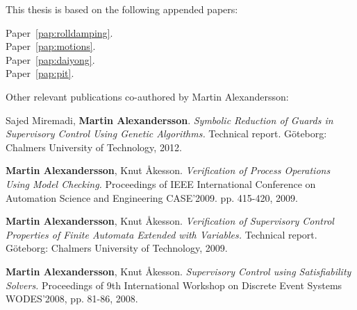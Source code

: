 
\begin{refsection}

This thesis is based on the following appended papers:

\begin{description}
\item[Paper~\ref{pap:rolldamping}.]

\item[Paper~\ref{pap:motions}.] 

\item[Paper~\ref{pap:daiyong}.] 

\item[Paper~\ref{pap:pit}.] 

\end{description}

\vspace{1cm}

\noindent Other relevant publications co-authored by Martin Alexandersson:
\begin{description}
\normalsize
\newcommand{\ME}{{\bfseries Martin Alexandersson}}

\item


\item Sajed Miremadi, \ME. \emph{Symbolic Reduction of Guards in Supervisory Control Using Genetic Algorithms.} Technical report. Göteborg: Chalmers University of Technology, 2012.

\item \ME, Knut Åkesson. \emph{Verification of Process Operations Using Model Checking.} Proceedings of IEEE International Conference on Automation Science and Engineering CASE'2009. pp. 415-420, 2009.

\item \ME, Knut Åkesson. \emph{Verification of Supervisory Control Properties of Finite Automata Extended with Variables.} Technical report. Göteborg: Chalmers University of Technology, 2009.

\item \ME, Knut Åkesson. \emph{Supervisory Control using Satisfiability Solvers.} Proceedings of 9th International Workshop on Discrete Event Systems WODES'2008, pp. 81-86, 2008.
\end{description}

\end{refsection}

